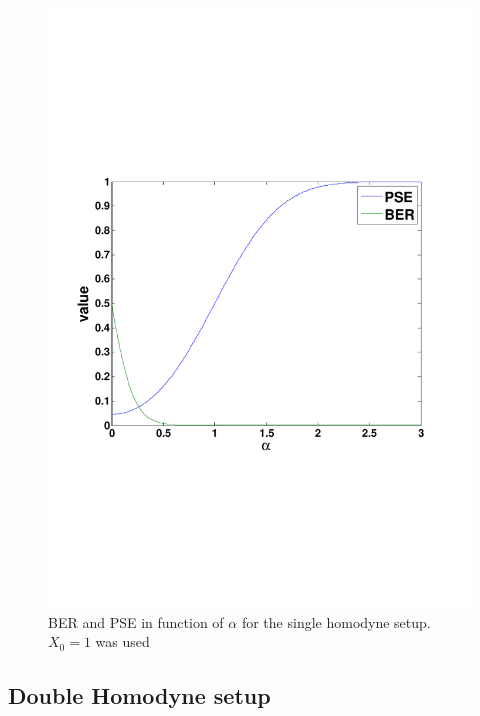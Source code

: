 \documentclass[a4paper]{article}
\begin{document}
\begin{figure}[h]
\centering
\includegraphics[width=\linewidth, trim= 0mm 60mm 0mm 70mm]{singlehomodyne.pdf}
\caption{BER and PSE in function of $\alpha$ for the single homodyne setup. $X_0=1$ was used}
\label{fig:ber}
\end{figure}



\subsection{Double Homodyne setup}
\end{document}
